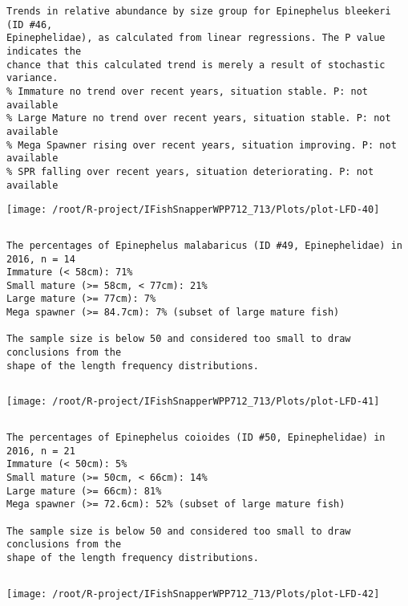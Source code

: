 \documentclass{report}\usepackage[]{graphicx}\usepackage[]{color}
\makeatletter
\def\maxwidth{ %
  \ifdim\Gin@nat@width>\linewidth
    \linewidth
  \else
    \Gin@nat@width
  \fi
}
\newenvironment{kframe}{%
 \def\at@end@of@kframe{}%
 \ifinner\ifhmode%
  \def\at@end@of@kframe{\end{minipage}}%
  \begin{minipage}{\columnwidth}%
 \fi\fi%
 \def\FrameCommand##1{\hskip\@totalleftmargin \hskip-\fboxsep
 \colorbox{shadecolor}{##1}\hskip-\fboxsep
     \hskip-\linewidth \hskip-\@totalleftmargin \hskip\columnwidth}%
 \MakeFramed {\advance\hsize-\width
   \@totalleftmargin\z@ \linewidth\hsize
   \@setminipage}}%
 {\par\unskip\endMakeFramed%
 \at@end@of@kframe}
\newenvironment{knitrout}{}{} %
\makeatother
\begin{document}
\begin{knitrout}
\begin{kframe}
\begin{verbatim}
Trends in relative abundance by size group for Epinephelus bleekeri (ID #46,
Epinephelidae), as calculated from linear regressions. The P value indicates the
chance that this calculated trend is merely a result of stochastic variance.
% Immature no trend over recent years, situation stable. P: not available
% Large Mature no trend over recent years, situation stable. P: not available
% Mega Spawner rising over recent years, situation improving. P: not available
% SPR falling over recent years, situation deteriorating. P: not available
\end{verbatim}
\end{kframe}
\texttt{[image: /root/R-project/IFishSnapperWPP712\_713/Plots/plot-LFD-40]} 
\begin{kframe}\begin{verbatim}
\end{verbatim}
\end{kframe}
\clearpage
\newpage
\begin{kframe}\begin{verbatim}
The percentages of Epinephelus malabaricus (ID #49, Epinephelidae) in 2016, n = 14
Immature (< 58cm): 71%
Small mature (>= 58cm, < 77cm): 21%
Large mature (>= 77cm): 7%
Mega spawner (>= 84.7cm): 7% (subset of large mature fish)
 
The sample size is below 50 and considered too small to draw conclusions from the
shape of the length frequency distributions.
\end{verbatim}
\end{kframe}
\newpage
\begin{kframe}\begin{verbatim}
\end{verbatim}
\end{kframe}
\texttt{[image: /root/R-project/IFishSnapperWPP712\_713/Plots/plot-LFD-41]} 
\begin{kframe}\begin{verbatim}
\end{verbatim}
\end{kframe}
\clearpage
\newpage
\begin{kframe}\begin{verbatim}
The percentages of Epinephelus coioides (ID #50, Epinephelidae) in 2016, n = 21
Immature (< 50cm): 5%
Small mature (>= 50cm, < 66cm): 14%
Large mature (>= 66cm): 81%
Mega spawner (>= 72.6cm): 52% (subset of large mature fish)
 
The sample size is below 50 and considered too small to draw conclusions from the
shape of the length frequency distributions.
\end{verbatim}
\end{kframe}
\newpage
\begin{kframe}\begin{verbatim}
\end{verbatim}
\end{kframe}
\texttt{[image: /root/R-project/IFishSnapperWPP712\_713/Plots/plot-LFD-42]} 


\end{knitrout}
\end{document}
